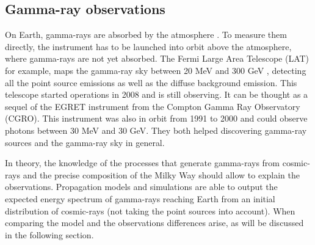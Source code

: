 

\subsection{Gamma-ray observations}

On Earth, gamma-rays are absorbed by the atmosphere \cite{HSU}. To measure them directly, the instrument has to be launched into orbit above the atmosphere, where gamma-rays are not yet absorbed. The Fermi Large Area Telescope (LAT) for example, maps the gamma-ray sky between 20 MeV and 300 GeV \cite{Fermi2009}, detecting all the point source emissions as well as the diffuse background emission. This telescope started operations in 2008 and is still observing. It can be thought as a sequel of the EGRET instrument \cite{Bertsch1989} from the Compton Gamma Ray Observatory (CGRO). This instrument was also in orbit from 1991 to 2000 and could observe photons between 30 MeV and 30 GeV. They both helped discovering gamma-ray sources and the gamma-ray sky in general.




In theory, the knowledge of the processes that generate gamma-rays from cosmic-rays and the precise composition of the Milky Way should allow to explain the observations. Propagation models and simulations are able to output the expected energy spectrum of gamma-rays reaching Earth from an initial distribution of cosmic-rays (not taking the point sources into account). When comparing the model and the observations differences arise, as will be discussed in the following section.


